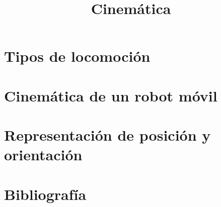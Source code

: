 \documentclass[compress]{beamer}
\title{Cinemática}
\author{}
\institute{Universidad Nacional de Rosario}
\date{}
\begin{document}
\frame{\titlepage}

\section{Tipos de locomoción}


\section{Cinemática de un robot móvil}


\section{Representación de posición y orientación}


\section{Bibliografía}

\end{document}
